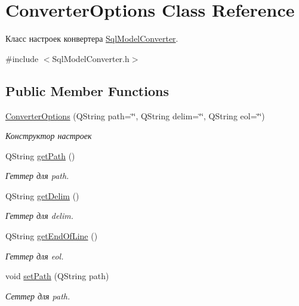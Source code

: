 \hypertarget{class_converter_options}{}\section{Converter\+Options Class Reference}
\label{class_converter_options}


Класс настроек конвертера \hyperlink{class_sql_model_converter}{Sql\+Model\+Converter}.  




{\ttfamily \#include $<$Sql\+Model\+Converter.\+h$>$}

\subsection*{Public Member Functions}
\begin{DoxyCompactItemize}
\item 
\hyperlink{class_converter_options_a99308bb0a82b2f0436a7236ffe1248b0}{Converter\+Options} (Q\+String path=\char`\"{}\char`\"{}, Q\+String delim=\char`\"{}\char`\"{}, Q\+String eol=\char`\"{}\char`\"{})
\begin{DoxyCompactList}\small\item\em Конструктор настроек \end{DoxyCompactList}\item 
Q\+String \hyperlink{class_converter_options_a8707c21da7c05009d27812ebe3b14c05}{get\+Path} ()
\begin{DoxyCompactList}\small\item\em Геттер для path. \end{DoxyCompactList}\item 
Q\+String \hyperlink{class_converter_options_ae2e25968130d28b79bc5bd1ae399a343}{get\+Delim} ()
\begin{DoxyCompactList}\small\item\em Геттер для delim. \end{DoxyCompactList}\item 
Q\+String \hyperlink{class_converter_options_aceb1c916ae42c07a21962b8bd0796540}{get\+End\+Of\+Line} ()
\begin{DoxyCompactList}\small\item\em Геттер для eol. \end{DoxyCompactList}\item 
void \hyperlink{class_converter_options_ad00e2c89e88aad4e4396ec2bc662c2c8}{set\+Path} (Q\+String path)
\begin{DoxyCompactList}\small\item\em Сеттер для path. \end{DoxyCompactList}\item 

\end{DoxyCompactItemize}
